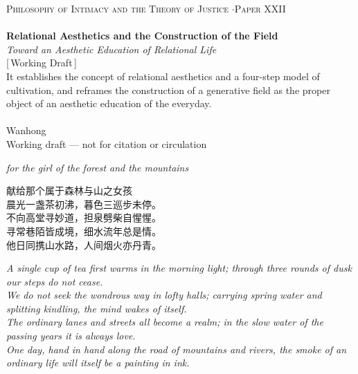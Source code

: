 \documentclass[11pt,a4paper]{article}
\begin{document}
\thispagestyle{empty}
\begin{center}
\vspace*{2cm}
{\footnotesize\color{rosedeep}\scshape Philosophy of Intimacy and the Theory of Justice \quad$\cdot$\quad Paper XXII}\\[0.3cm]
\coverrule\\[1.2cm]
{\LARGE\bfseries\color{warnred} Relational Aesthetics and the Construction of the Field}\\[0.7cm]
{\large\itshape\color{warnred} Toward an Aesthetic Education of Relational Life}\\[0.8cm]
{\small\color{gold} [\,Working Draft\,]}\\[0.8cm]
{\normalsize\color{ink} It establishes the concept of relational aesthetics and a four-step model of cultivation, and reframes the construction of a generative field as the proper object of an aesthetic education of the everyday.}\\[2cm]
\coverrule[0.25]\\[0.6cm]
{\normalsize\color{ink} Wanhong}\\
\vfill
{\footnotesize\color{gold} Working draft --- not for citation or circulation}
\coverfootnote
\end{center}
\clearpage

\thispagestyle{empty}
\null\vfill
\begin{center}
\itshape\color{rose}\large
for the girl of the forest and the mountains
\end{center}

\vspace{2em}

\begin{center}
{\cjk\upshape\color{deeprose}
献给那个属于森林与山之女孩\\[1.2em]
\normalsize
晨光一盏茶初沸，暮色三巡步未停。\\
不向高堂寻妙道，担泉劈柴自惺惺。\\
寻常巷陌皆成境，细水流年总是情。\\
他日同携山水路，人间烟火亦丹青。
}
\end{center}

\vspace{1.5em}

\begin{center}
{\color{goldenrod}\itshape\small
A single cup of tea first warms in the morning light; through three rounds of dusk our steps do not cease.\\
We do not seek the wondrous way in lofty halls; carrying spring water and splitting kindling, the mind wakes of itself.\\
The ordinary lanes and streets all become a realm; in the slow water of the passing years it is always love.\\
One day, hand in hand along the road of mountains and rivers, the smoke of an ordinary life will itself be a painting in ink.
}
\end{center}
\end{document}
